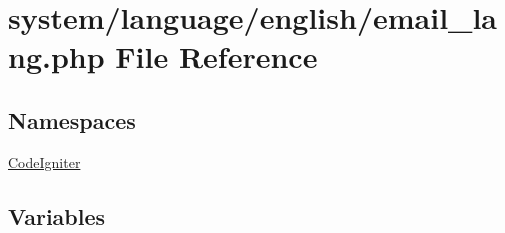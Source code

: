 \hypertarget{email__lang_8php}{}\section{system/language/english/email\+\_\+lang.php File Reference}
\label{email__lang_8php}
\subsection*{Namespaces}
\begin{DoxyCompactItemize}
\item 
 \mbox{\hyperlink{namespace_code_igniter}{Code\+Igniter}}
\end{DoxyCompactItemize}
\subsection*{Variables}
